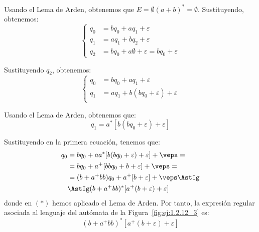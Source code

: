 \begin{ejercicio}
\begin{enumerate}
        Usando el Lema de Arden, obtenemos que $E=\emptyset(a+b)^*=\emptyset$. Sustituyendo, obtenemos:
        \begin{equation*}
            \begin{cases}
                q_0 &= bq_0 + aq_1 + \varepsilon\\
                q_1 &= aq_1 + bq_2 + \varepsilon\\
                q_2 &= bq_0 + a\emptyset + \varepsilon = bq_0 + \varepsilon
            \end{cases}
        \end{equation*}

        Sustituyendo $q_2$, obtenemos:
        \begin{equation*}
            \begin{cases}
                q_0 &= bq_0 + aq_1 + \varepsilon\\
                q_1 &= aq_1 + b(bq_0 + \varepsilon) + \varepsilon\\
            \end{cases}
        \end{equation*}

        Usando el Lema de Arden, obtenemos que:
        \begin{equation*}
            q_1 = a^*[b(bq_0 + \varepsilon) + \varepsilon]
        \end{equation*}

        Sustituyendo en la primera ecuación, tenemos que:
        \begin{align*}
            q_0 &= bq_0 +aa^*[b(bq_0 + \varepsilon) + \varepsilon] + \veps=\\
            &= bq_0 + a^+[bbq_0 + b + \varepsilon] + \veps =\\
            &= (b+a^+bb)q_0 + a^+[b + \varepsilon] + \veps \AstIg\\
            &\AstIg (b+a^+bb)^*[a^+(b + \varepsilon)+\varepsilon]
        \end{align*}
        donde en $(\ast)$ hemos aplicado el Lema de Arden.
        Por tanto, la expresión regular asociada al lenguaje del autómata de la Figura~\ref{fig:ej:1.2.12_3} es:
        \begin{equation*}
            (b+a^+bb)^*[a^+(b + \varepsilon)+\varepsilon]
        \end{equation*}
    \end{enumerate}
\end{ejercicio}

